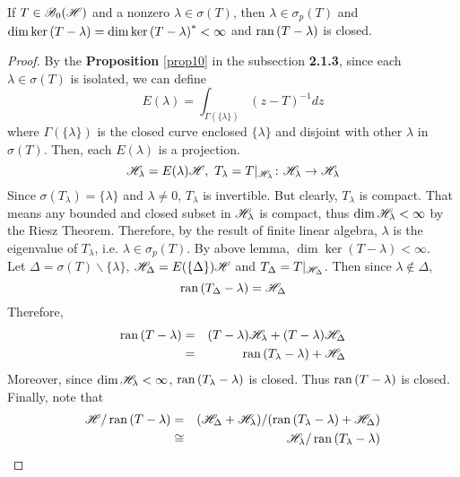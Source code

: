 \documentclass[a4paper,11pt]{report}
\begin{document}
\begin{thm} \label{thm12}
	If $T \in \mathscr{B}_{0}\mathscr{(H)}$ and a nonzero $\lambda \in \sigma(T)$, then $\lambda \in \sigma_p(T)$ and $\dim{\ker{(T-\lambda)}} = \dim{\ker{(T-\lambda)}^{*}} < \infty$ and $\operatorname{ran}{(T-\lambda)}$ is closed.
\end{thm}
\begin{proof}
	By the \textbf{Proposition} \ref{prop10} in the subsection \textbf{2.1.3}, since each $\lambda \in \sigma(T)$ is isolated, we can define
	\begin{equation*}
		E(\lambda) = \int_{\Gamma(\{\lambda\})} (z-T)^{-1} dz 
	\end{equation*}
	where $\Gamma(\{\lambda\})$ is the closed curve enclosed $\{\lambda\}$ and disjoint with other $\lambda$ in $\sigma(T)$. Then, each $E(\lambda)$ is a projection.
	\begin{equation*}
		\mathscr{H}_{\lambda} = E(\lambda)\mathscr{H},~ T_{\lambda} = T|_{\mathscr{H}_{\lambda}} \colon \mathscr{H}_{\lambda} \rightarrow \mathscr{H}_{\lambda}
	\end{equation*}
	Since $\sigma(T_{\lambda}) = \{\lambda\}$ and $\lambda \neq 0$, $T_{\lambda}$ is invertible. But clearly, $T_{\lambda}$ is compact. That means any bounded and closed subset in $\mathscr{H}_{\lambda}$ is compact, thus $\dim{\mathscr{H}_{\lambda}} < \infty$ by the Riesz Theorem. Therefore, by the result of finite linear algebra, $\lambda$ is the eigenvalue of $T_{\lambda}$, i.e. $\lambda \in \sigma_p(T)$. By above lemma, $\dim{\ker{(T-\lambda)}} < \infty$.\\
	Let $\Delta = \sigma(T) \backslash \{\lambda\}$, $\mathscr{H}_{\Delta} = E(\{\Delta\})\mathscr{H}$ and $T_{\Delta} = T|_{\mathscr{H}_{\Delta}}$. Then since $\lambda \notin \Delta$,
	\begin{equation*}
		\operatorname{ran}{(T_{\Delta}-\lambda)} = \mathscr{H}_{\Delta}
	\end{equation*}
	Therefore, 
	\begin{eqnarray*}
		\operatorname{ran}{(T-\lambda)} &=& (T-\lambda)\mathscr{H}_{\lambda}+(T-\lambda)\mathscr{H}_{\Delta} \\
		&=& \operatorname{ran}{(T_{\lambda}-\lambda)} + \mathscr{H}_{\Delta}
	\end{eqnarray*}
	Moreover, since $\dim{\mathscr{H}_{\lambda}} < \infty$, $\operatorname{ran}{(T_{\lambda}-\lambda)}$ is closed. Thus $\operatorname{ran}{(T-\lambda)}$ is closed.\\
	Finally, note that
	\begin{eqnarray*}
		\Hs / \ran{(T-\lambda)} &=& (\Hs_{\Delta} + \Hs_{\lambda}) / (\ran{(T_{\lambda}-\lambda)} + \Hs_{\Delta}) \\
		&\cong& \Hs_{\lambda} / \ran{(T_{\lambda}-\lambda)}

\end{eqnarray*}
\end{proof}
\end{document}
